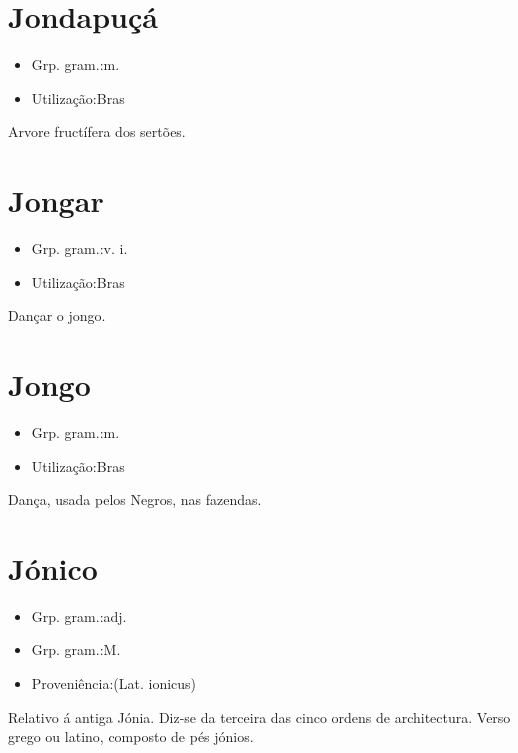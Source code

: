 \documentclass{article}
\begin{document}
\section{Jondapuçá}
\begin{itemize}
\item {Grp. gram.:m.}
\end{itemize}
\begin{itemize}
\item {Utilização:Bras}
\end{itemize}
Arvore fructífera dos sertões.
\section{Jongar}
\begin{itemize}
\item {Grp. gram.:v. i.}
\end{itemize}
\begin{itemize}
\item {Utilização:Bras}
\end{itemize}
Dançar o jongo.
\section{Jongo}
\begin{itemize}
\item {Grp. gram.:m.}
\end{itemize}
\begin{itemize}
\item {Utilização:Bras}
\end{itemize}
Dança, usada pelos Negros, nas fazendas.
\section{Jónico}
\begin{itemize}
\item {Grp. gram.:adj.}
\end{itemize}
\begin{itemize}
\item {Grp. gram.:M.}
\end{itemize}
\begin{itemize}
\item {Proveniência:(Lat. \textunderscore ionicus\textunderscore )}
\end{itemize}
Relativo á antiga Jónia.
Diz-se da terceira das cinco ordens de architectura.
Verso grego ou latino, composto de pés jónios.
\end{document}
